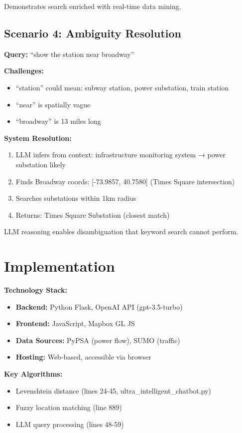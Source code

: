 \documentclass[sigconf]{acmart}
\begin{document}
Demonstrates search enriched with real-time data mining.

\subsection{Scenario 4: Ambiguity Resolution}

\textbf{Query:} ``show the station near broadway''

\textbf{Challenges:}
\begin{itemize}
    \item ``station'' could mean: subway station, power substation, train station
    \item ``near'' is spatially vague
    \item ``broadway'' is 13 miles long
\end{itemize}

\textbf{System Resolution:}
\begin{enumerate}
    \item LLM infers from context: infrastructure monitoring system → power substation likely
    \item Finds Broadway coords: [-73.9857, 40.7580] (Times Square intersection)
    \item Searches substations within 1km radius
    \item Returns: Times Square Substation (closest match)
\end{enumerate}

LLM reasoning enables disambiguation that keyword search cannot perform.

\section{Implementation}

\textbf{Technology Stack:}
\begin{itemize}
    \item \textbf{Backend:} Python Flask, OpenAI API (gpt-3.5-turbo)
    \item \textbf{Frontend:} JavaScript, Mapbox GL JS
    \item \textbf{Data Sources:} PyPSA (power flow), SUMO (traffic)
    \item \textbf{Hosting:} Web-based, accessible via browser
\end{itemize}

\textbf{Key Algorithms:}
\begin{itemize}
    \item Levenshtein distance (lines 24-45, ultra\_intelligent\_chatbot.py)
    \item Fuzzy location matching (line 889)
    \item LLM query processing (lines 48-59)
\end{itemize}
\end{document}
